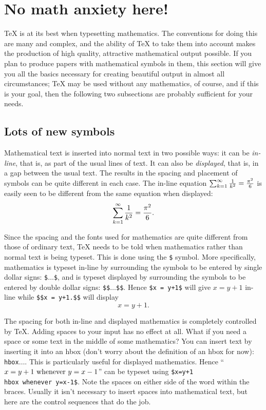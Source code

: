  
\section{No math anxiety here!} 
 
\TeX{} is at its best when typesetting mathematics.  The 
conventions for doing this are many and complex, and the ability 
of \TeX{} to take them into account makes the production of high 
quality, attractive mathematical output possible.  If you plan to 
produce papers with mathematical symbols in them, this section 
will give you all the basics necessary for creating beautiful 
output in almost all circumstances; \TeX{} may be used without 
any mathematics, of course, and if this is your goal, then the 
following two subsections are probably sufficient for your needs. 
 
\subsection{Lots of new symbols} 
 
Mathematical text is inserted into normal text in two possible 
ways: it can be {\sl in-line\/}, that is, as part of the usual 
lines of text.  It can also be {\sl displayed}, that is, \centred{} 
in a gap between the usual text.  The results in the spacing and 
placement of symbols can be quite different in each case.  The 
in-line equation $\sum_{k=1}^{\infty} {1\over k^2} = {\pi^2\over6}$ 
is easily seen to be different from the same equation when 
displayed: 
$$\sum_{k=1}^{\infty} {1\over k^2} = {\pi^2\over6}.$$ 
 
Since the spacing and the fonts used for mathematics are quite 
different from those of ordinary text, \TeX{} needs to be told 
when mathematics rather than normal text is being typeset.  This 
is done using the {\tt\$} symbol.  More specifically, mathematics 
is typeset in-line by surrounding the symbols to be entered by 
single dollar signs: {\tt \$$\ldots$\$}, and is typeset displayed 
by surrounding the symbols to be entered by double dollar signs: 
{\tt \$\$$\ldots$\$\$}\null.  Hence {\tt \$x = y+1\$} will give 
$x=y+1$ in-line while {\tt \$\$x = y+1.\$\$} will display 
$$x=y+1.$$ 
 
The spacing for both in-line and displayed mathematics is 
completely controlled by \TeX\null.  Adding spaces to your input 
has no effect at all.  What if you need a space or some text in 
the middle of some mathematics?  You can insert text by inserting 
it into an hbox (don't worry about the definition of an hbox for 
now): {\tt \\hbox\lb$\ldots$\rb}\null.  This is particularly 
useful for displayed mathematics.  Hence ``$x=y+1 \hbox{ whenever 
} y=x-1$'' can be typeset using {\tt \$x=y+1 \\hbox\lb\ whenever 
\rb y=x-1\$}. Note the spaces on either side of the word within 
the braces. Usually it isn't necessary to insert spaces into 
mathematical text, but here are the control sequences that do the 
job. 
 
